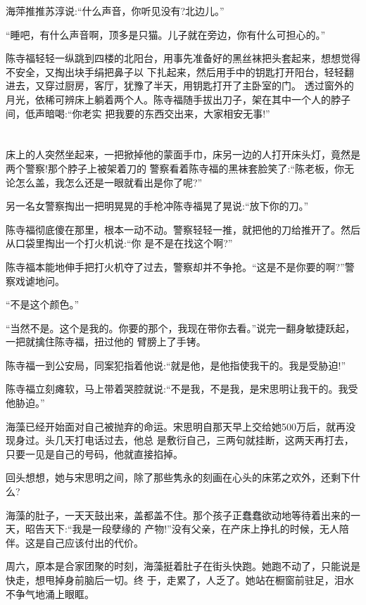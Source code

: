\documentclass[11pt,a4paper,onecolumn]{article}
\begin{document}
海萍推推苏淳说:``什么声音，你听见没有?北边儿。''

``睡吧，有什么声音啊，顶多是只猫。儿子就在旁边，你有什么可担心的。''

陈寺福轻轻一纵跳到四楼的北阳台，用事先准备好的黑丝袜把头套起来，想想觉得不安全，又掏出块手绢把鼻子以
下扎起来，然后用手中的钥匙打开阳台，轻轻翻进去，又穿过厨房，客厅，犹豫了半天，用钥匙打开了主卧室的门。
透过窗外的月光，依稀可辨床上躺着两个人。陈寺福随手拔出刀子，架在其中一个人的脖子间，低声暗喝:``你老实
把我要的东西交出来，大家相安无事!''

\section[\thesection]{}

床上的人突然坐起来，一把掀掉他的蒙面手巾，床另一边的人打开床头灯，竟然是两个警察!那个脖子上被架着刀的
警察看着陈寺福的黑袜套脸笑了:``陈老板，你无论怎么盖，我怎么还是一眼就看出是你了呢?''

另一名女警察掏出一把明晃晃的手枪冲陈寺福晃了晃说:``放下你的刀。''

陈寺福彻底傻在那里，根本一动不动。警察轻轻一推，就把他的刀给推开了。然后从口袋里掏出一个打火机说:``你
是不是在找这个啊?''

陈寺福本能地伸手把打火机夺了过去，警察却并不争抢。``这是不是你要的啊?''警察戏谑地问。

``不是这个颜色。''

``当然不是。这个是我的。你要的那个，我现在带你去看。''说完一翻身敏捷跃起，一把就擒住陈寺福，扭过他的
臂膀上了手铐。

陈寺福一到公安局，同案犯指着他说:``就是他，是他指使我干的。我是受胁迫!''

陈寺福立刻瘫软，马上带着哭腔就说:``不是我，不是我，是宋思明让我干的。我受他胁迫。''

海藻已经开始面对自己被抛弃的命运。宋思明自那天早上交给她500万后，就再没现身过。头几天打电话过去，他总
是敷衍自己，三两句就挂断，这两天再打去，只要一见是自己的号码，他就直接掐掉。

回头想想，她与宋思明之间，除了那些隽永的刻画在心头的床笫之欢外，还剩下什么?

海藻的肚子，一天天鼓出来，盖都盖不住。那个孩子正蠢蠢欲动地等待着出来的一天，昭告天下:``我是一段孽缘的
产物!''没有父亲，在产床上挣扎的时候，无人陪伴。这是自己应该付出的代价。

周六，原本是合家团聚的时刻，海藻挺着肚子在街头快跑。她跑不动了，只能说是快走，想甩掉身前脑后一切。终
于，走累了，人乏了。她站在橱窗前驻足，泪水不争气地涌上眼眶。
\end{document}
